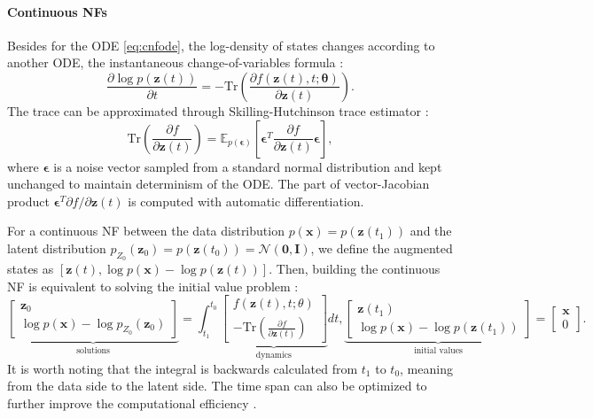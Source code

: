 \paragraph{Continuous \acp{NF}}
Besides for the ODE \ref{eq:cnfode}, the log-density of states changes according to another \ac{ODE}, the instantaneous change-of-variables formula \citep{chen2019node}:
\begin{equation}
    \label{eq:instchangeofvar}
    \frac{\partial\log p(\boldsymbol{z}(t))}{\partial t}=-\text{Tr}(\frac{\partial f(\boldsymbol{z}(t),t;\boldsymbol{\theta})}{\partial\boldsymbol{z}(t)}).
\end{equation}
The trace can be approximated through Skilling-Hutchinson trace estimator \citep{Skilling1989,Hutchinson01011990,adams2018adams}:
\begin{equation}
    \text{Tr}(\frac{\partial f}{\partial \boldsymbol{z}(t)})=\mathbb{E}_{p(\boldsymbol{\epsilon})}[\boldsymbol{\epsilon}^T\frac{\partial f}{\partial \boldsymbol{z}(t)}\boldsymbol{\epsilon}],
\end{equation}
where $\boldsymbol{\epsilon}$ is a noise vector sampled from a standard normal distribution and kept unchanged to maintain determinism of the \ac{ODE}. The part of vector-Jacobian product $\boldsymbol{\epsilon}^T\partial f/\partial \boldsymbol{z}(t)$ is computed with automatic differentiation.

For a continuous \ac{NF} between the data distribution $p(\boldsymbol{x})=p(\boldsymbol{z}(t_1))$ and the latent distribution $p_{Z_0}(\boldsymbol{z}_0)=p(\boldsymbol{z}(t_0))=\mathcal{N}(\boldsymbol{0}, \boldsymbol{I})$, we define the augmented states as $[\boldsymbol{z}(t), \log p(\boldsymbol{x})-\log p(\boldsymbol{z}(t))]$.
Then, building the continuous \ac{NF} is equivalent to solving the initial value problem \citep{grathwohl2018ffjord}:
\begin{equation}
    \underbrace{\begin{bmatrix}
\boldsymbol{z}_0 \\
\log p(\boldsymbol{x}) - \log p_{Z_0}(\boldsymbol{z}_0)
\end{bmatrix}}_{\text{solutions}}
=
\int_{t_1}^{t_0}
\underbrace{\begin{bmatrix}
f(\boldsymbol{z}(t), t; \theta) \\
-\text{Tr}\left(\frac{\partial f}{\partial \boldsymbol{z}(t)}\right)
\end{bmatrix}}_{\text{dynamics}} dt,
\underbrace{\begin{bmatrix}
\boldsymbol{z}(t_1) \\
\log p(\boldsymbol{x}) - \log p(\boldsymbol{z}(t_1))
\end{bmatrix}}_{\text{initial values}}
=
\begin{bmatrix}
\boldsymbol{x} \\
0
\end{bmatrix}.
\end{equation}
It is worth noting that the integral is backwards calculated from $t_1$ to $t_0$, meaning from the data side to the latent side. The time span can also be optimized to further improve the computational efficiency \citep{du2022toflow}.

